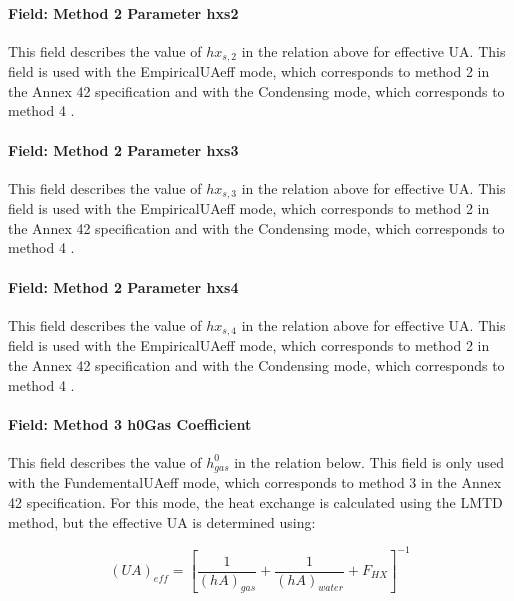 \paragraph{Field: Method 2 Parameter hxs2}\label{field-method-2-parameter-hxs2}

This field describes the value of \(h{x_{s,2}}\) in the relation above for effective UA. This field is used with the EmpiricalUAeff mode, which corresponds to method 2 in the Annex 42 specification and with the Condensing mode, which corresponds to method 4 .

\paragraph{Field: Method 2 Parameter hxs3}\label{field-method-2-parameter-hxs3}

This field describes the value of \(h{x_{s,3}}\) in the relation above for effective UA. This field is used with the EmpiricalUAeff mode, which corresponds to method 2 in the Annex 42 specification and with the Condensing mode, which corresponds to method 4 .

\paragraph{Field: Method 2 Parameter hxs4}\label{field-method-2-parameter-hxs4}

This field describes the value of \(h{x_{s,4}}\) in the relation above for effective UA. This field is used with the EmpiricalUAeff mode, which corresponds to method 2 in the Annex 42 specification and with the Condensing mode, which corresponds to method 4 .

\paragraph{Field: Method 3 h0Gas Coefficient}\label{field-method-3-h0gas-coefficient}

This field describes the value of \(h_{gas}^0\) in the relation below. This field is only used with the FundementalUAeff mode, which corresponds to method 3 in the Annex 42 specification. For this mode, the heat exchange is calculated using the LMTD method, but the effective UA is determined using:

\begin{equation}
{\left( {UA} \right)_{eff}} = {\left[ {\frac{1}{{{{\left( {hA} \right)}_{gas}}}} + \frac{1}{{{{(hA)}_{water}}}} + {F_{HX}}} \right]^{ - 1}}
\end{equation}

